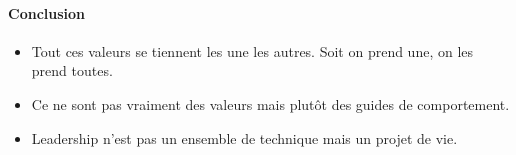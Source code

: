 \documentclass[11pt]{article} %
\begin{document}
\paragraph{Conclusion} 

\begin{itemize}

    \item Tout ces valeurs se tiennent les une les autres. Soit on prend
    une, on les prend toutes.

    \item Ce ne sont pas vraiment des valeurs mais plutôt des guides de
    comportement.

    \item Leadership n'est pas un ensemble de technique mais un projet
de vie.

\end{itemize}
\end{document}
